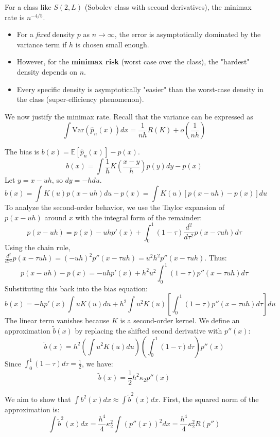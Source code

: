 \begin{remark}
     For a class like $S(2, L)$ (Sobolev class with second derivatives), the minimax rate is $n^{-4/5}$.
\begin{itemize}
    \item For a \textit{fixed} density $p$ as $n \to \infty$, the error is asymptotically dominated by the variance term if $h$ is chosen small enough.
    \item However, for the \textbf{minimax risk} (worst case over the class), the "hardest" density depends on $n$.
    \item Every specific density is asymptotically "easier" than the worst-case density in the class (super-efficiency phenomenon).
\end{itemize}
\end{remark}




We now justify the minimax rate. Recall that the variance can be expressed as 
$$ \int \text{Var}(\hat{p}_n(x)) dx = \frac{1}{nh} R(K) + o\left(\frac{1}{nh}\right) $$

The bias is $b(x) = \mathbb{E}[\hat{p}_n(x)] - p(x)$.
$$ b(x) = \int \frac{1}{h} K\left(\frac{x-y}{h}\right) p(y) dy - p(x) $$
Let $y = x - uh$, so $dy = -h du$.
$$ b(x) = \int K(u) p(x - uh) du - p(x) = \int K(u) [p(x - uh) - p(x)] du $$
To analyze the second-order behavior, we use the Taylor expansion of $p(x-uh)$ around $x$ with the integral form of the remainder:
$$ p(x - uh) = p(x) - uh p'(x) + \int_0^1 (1-\tau) \frac{d^2}{d\tau^2} p(x - \tau u h) d\tau $$
Using the chain rule, $\frac{d^2}{d\tau^2} p(x - \tau u h) = (-uh)^2 p''(x - \tau u h) = u^2 h^2 p''(x - \tau u h)$.
Thus:
$$ p(x - uh) - p(x) = -uh p'(x) + h^2 u^2 \int_0^1 (1-\tau) p''(x - \tau u h) d\tau $$
Substituting this back into the bias equation:
$$ b(x) = -h p'(x) \int u K(u) du + h^2 \int u^2 K(u) \left[ \int_0^1 (1-\tau) p''(x - \tau u h) d\tau \right] du $$
The linear term vanishes because $K$ is a second-order kernel. We define an approximation $\tilde{b}(x)$ by replacing the shifted second derivative with $p''(x)$:
$$ \tilde{b}(x) = h^2 \left( \int u^2 K(u) du \right) \left( \int_0^1 (1-\tau) d\tau \right) p''(x) $$
Since $\int_0^1 (1-\tau) d\tau = \frac{1}{2}$, we have:
$$ \tilde{b}(x) = \frac{1}{2} h^2 \kappa_2 p''(x) $$


We aim to show that $\int b^2(x) dx \approx \int \tilde{b}^2(x) dx$.
First, the squared norm of the approximation is:
$$ \int \tilde{b}^2(x) dx = \frac{h^4}{4} \kappa_2^2 \int (p''(x))^2 dx = \frac{h^4}{4} \kappa_2^2 R(p'') $$

